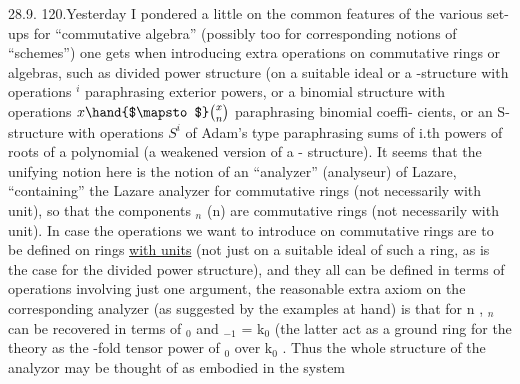 
28.9.
120.\quad Yesterday I pondered a little on the common features of the various
set-ups for ``commutative algebra'' (possibly too for corresponding notions
of ``schemes'') one gets when introducing extra operations on commutative
rings or algebras, such as divided power structure (on a suitable ideal\hand{),}
or a \hand{$\lambda$}-structure with operations \hand{$\lambda$}$^i$ paraphrasing exterior powers, or a
binomial structure with operations $x\hand{$\mapsto$}\binom{x}{n}$ paraphrasing binomial coeffi-%
cients, or an S-structure with operations $S^i$ of Adam's type paraphrasing
sums of i.th powers of roots of a polynomial (a weakened version of a \hand{$\lambda$}-%
structure). It seems that the unifying notion here is the notion of an
``analyzer'' (analyseur) of Lazare, ``containing'' the Lazare analyzer for
commutative rings (not necessarily with unit), so that the components
 \hand{$\Omega$}$_n$ (n\hand{$\geqslant$}) are commutative rings (not necessarily with unit). In case
the  operations we want to introduce on commutative rings are
to be defined on rings \uline{with units} (not just on a suitable ideal of such
a ring, as is the case for the divided power structure), and they all
can be defined in terms of operations involving just one argument, the
reasonable extra axiom on  the corresponding analyzer (as suggested by
the examples at hand) is that for n \hand{$\geqslant$} , \hand{$\Omega$}$_n$ can be recovered in terms
of \hand{$\Omega$}$_0$ and \hand{$\Omega$}$_{-1}$ = k$_0$ (the latter act as a ground ring for the theory\hand{)}
as the -fold tensor power of \hand{$\Omega$}$_0$ over k$_0$ . Thus the whole structure of
 the analyzor may be thought of as embodied in the system  
